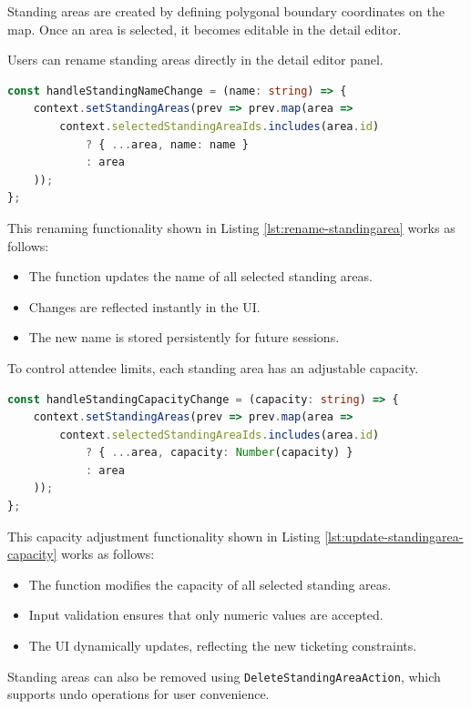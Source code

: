 Standing areas are created by defining polygonal boundary coordinates on the map. Once an area is selected, it becomes editable in the detail editor.

Users can rename standing areas directly in the detail editor panel.

\begin{lstlisting}[language=TypeScript, caption=Renaming Standing Areas, label=lst:rename-standingarea]
const handleStandingNameChange = (name: string) => {
    context.setStandingAreas(prev => prev.map(area =>
        context.selectedStandingAreaIds.includes(area.id)
            ? { ...area, name: name }
            : area
    ));
};
\end{lstlisting}

This renaming functionality shown in Listing \ref{lst:rename-standingarea} works as follows:
\begin{itemize}
    \item The function updates the name of all selected standing areas.
    \item Changes are reflected instantly in the UI.
    \item The new name is stored persistently for future sessions.
\end{itemize}
To control attendee limits, each standing area has an adjustable capacity.

\begin{lstlisting}[language=TypeScript, caption=Updating Standing Area Capacity, label=lst:update-standingarea-capacity]
const handleStandingCapacityChange = (capacity: string) => {
    context.setStandingAreas(prev => prev.map(area =>
        context.selectedStandingAreaIds.includes(area.id)
            ? { ...area, capacity: Number(capacity) }
            : area
    ));
};
\end{lstlisting}

This capacity adjustment functionality shown in Listing \ref{lst:update-standingarea-capacity} works as follows:
\begin{itemize}
    \item The function modifies the capacity of all selected standing areas.
    \item Input validation ensures that only numeric values are accepted.
    \item The UI dynamically updates, reflecting the new ticketing constraints.
\end{itemize}

Standing areas can also be removed using \texttt{DeleteStandingAreaAction}, which supports undo operations for user convenience.

